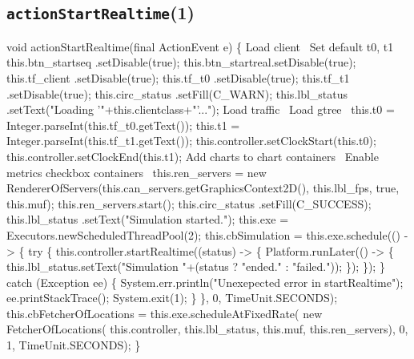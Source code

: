\subsection{\texttt{actionStartRealtime}(1)}
\nwenddocs{}\endmoddef{}
void actionStartRealtime(final ActionEvent e) \{
  \LA{}Load client~{\nwtagstyle{}}\RA{}
  \LA{}Set default t0, t1~{\nwtagstyle{}}\RA{}
  this.btn_startseq .setDisable(true);
  this.btn_startreal.setDisable(true);
  this.tf_client     .setDisable(true);
  this.tf_t0        .setDisable(true);
  this.tf_t1        .setDisable(true);
  this.circ_status  .setFill(C_WARN);
  this.lbl_status   .setText("Loading '"+this.clientclass+"'...");
  \LA{}Load traffic~{\nwtagstyle{}}\RA{}
  \LA{}Load gtree~{\nwtagstyle{}}\RA{}
  this.t0 = Integer.parseInt(this.tf_t0.getText());
  this.t1 = Integer.parseInt(this.tf_t1.getText());
  this.controller.setClockStart(this.t0);
  this.controller.setClockEnd(this.t1);
  \LA{}Add charts to chart containers~{\nwtagstyle{}}\RA{}
  \LA{}Enable metrics checkbox containers~{\nwtagstyle{}}\RA{}
  this.ren_servers = new RendererOfServers(this.can_servers.getGraphicsContext2D(), this.lbl_fps, true, this.muf);
  this.ren_servers.start();
  this.circ_status  .setFill(C_SUCCESS);
  this.lbl_status   .setText("Simulation started.");
  this.exe = Executors.newScheduledThreadPool(2);
  this.cbSimulation = this.exe.schedule(() -> \{
    try \{
      this.controller.startRealtime((status) -> \{
        Platform.runLater(() -> \{
          this.lbl_status.setText("Simulation "+(status ? "ended." : "failed."));
        \});
      \});
    \} catch (Exception ee) \{
      System.err.println("Unexepected error in startRealtime");
      ee.printStackTrace();
      System.exit(1);
    \}
  \}, 0, TimeUnit.SECONDS);
  this.cbFetcherOfLocations = this.exe.scheduleAtFixedRate(
      new FetcherOfLocations(
        this.controller, this.lbl_status, this.muf, this.ren_servers), 0, 1, TimeUnit.SECONDS);
\}
\eatline
{}\nwendcode{}\nwdocspar
